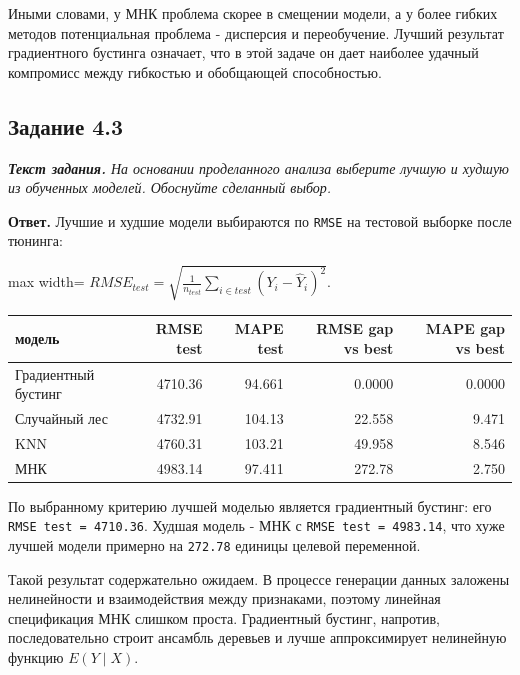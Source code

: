\documentclass[11pt]{article}
\newcounter{none}
\newenvironment{tasktext}
      {\begin{tcolorbox}[breakable, colback=black!3, colframe=black!28,
        boxrule=0.4pt, arc=1.5mm, left=7pt, right=7pt, top=5pt, bottom=5pt,
        before skip=0.35em, after skip=0.75em]\itshape}
      {\end{tcolorbox}}
\begin{document}
Иными словами, у МНК проблема скорее в смещении модели, а у более гибких
методов потенциальная проблема - дисперсия и переобучение. Лучший
результат градиентного бустинга означает, что в этой задаче он дает
наиболее удачный компромисс между гибкостью и обобщающей способностью.

    \subsection{Задание 4.3}\label{ux437ux430ux434ux430ux43dux438ux435-4.3}

\begin{tasktext}
\textbf{Текст задания.} На основании проделанного анализа выберите
лучшую и худшую из обученных моделей. Обоснуйте сделанный выбор.
\end{tasktext}

\textbf{Ответ.} Лучшие и худшие модели выбираются по \texttt{RMSE} на
тестовой выборке после тюнинга:

\begin{center}
\begin{adjustbox}{max width=\linewidth}
\(\displaystyle RMSE_{test} = \sqrt{\frac{1}{n_{test}}\sum_{i \in test}(Y_i - \hat Y_i)^2}.\)
\end{adjustbox}
\end{center}

{\def\LTcaptype{none} %
\begin{longtable}[]{@{}lrrrr@{}}
\toprule\noalign{}
модель & RMSE test & MAPE test & RMSE gap vs best & MAPE gap vs best \\
\midrule\noalign{}
\endhead
\bottomrule\noalign{}
\endlastfoot
Градиентный бустинг & 4710.36 & 94.661 & 0.0000 & 0.0000 \\
Случайный лес & 4732.91 & 104.13 & 22.558 & 9.471 \\
KNN & 4760.31 & 103.21 & 49.958 & 8.546 \\
МНК & 4983.14 & 97.411 & 272.78 & 2.750 \\
\end{longtable}
}

По выбранному критерию лучшей моделью является градиентный бустинг: его
\texttt{RMSE\ test\ =\ 4710.36}. Худшая модель - МНК с
\texttt{RMSE\ test\ =\ 4983.14}, что хуже лучшей модели примерно на
\texttt{272.78} единицы целевой переменной.

Такой результат содержательно ожидаем. В процессе генерации данных
заложены нелинейности и взаимодействия между признаками, поэтому
линейная спецификация МНК слишком проста. Градиентный бустинг, напротив,
последовательно строит ансамбль деревьев и лучше аппроксимирует
нелинейную функцию \(E(Y\mid X)\).
\end{document}
